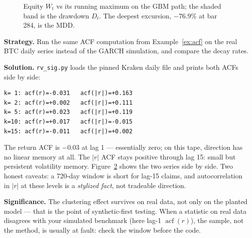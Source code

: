 \begin{figure}[ht]\centering

\caption{Equity $W_t$ vs its running maximum on the GBM path; the
shaded band is the drawdown $D_t$. The deepest excursion,
$-76.9\%$ at bar 284, is the $\mathrm{MDD}$.}
\label{fig:dd}
\end{figure}

\begin{example}\label{ex:acfmag}
\textbf{Strategy.} Run the same ACF computation from
Example~\ref{ex:acf} on the real BTC daily series instead of the
GARCH simulation, and compare the decay rates.

\textbf{Solution.} \texttt{rv\_sig.py} loads the pinned Kraken daily
file and prints both ACFs side by side:
\begin{verbatim}
k= 1: acf(r)=-0.031   acf(|r|)=+0.163
k= 2: acf(r)=+0.002   acf(|r|)=+0.111
k= 5: acf(r)=+0.023   acf(|r|)=+0.119
k=10: acf(r)=+0.017   acf(|r|)=-0.015
k=15: acf(r)=-0.011   acf(|r|)=+0.002
\end{verbatim}
The return ACF is $-0.03$ at lag 1 --- essentially zero; on this
tape, direction has no linear memory at all. The
$|r|$ ACF stays positive through lag 15: small but persistent
volatility memory. Figure~\ref{fig:acfmag} shows the two series
side by side. Two honest caveats: a 720-day window is short for
lag-15 claims, and autocorrelation in $|r|$ at these levels is a
\emph{stylized fact}, not tradeable direction.

\textbf{Significance.} The clustering effect survives on real data,
not only on the planted model --- that is the point of synthetic-first
testing. When a statistic on real data disagrees with your simulated
benchmark (here lag-1 $\operatorname{acf}(r)$), the sample, not the
method, is usually at fault: check the window before the code.
\end{example}
\begin{figure}[ht]\centering

\label{fig:acfmag}
\end{figure}

